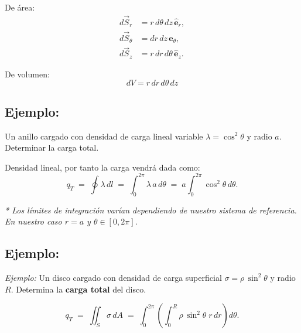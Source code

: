 \documentclass[a4paper,12pt]{article}
\begin{document}
De área:
\[
\begin{aligned}
d\vec{S}_r      &= r\,d\theta\,dz\,\hat{\mathbf e}_r,\\
d\vec{S}_\theta &= dr\,dz\,\hat{\mathbf e}_\theta,\\
d\vec{S}_z      &= r\,dr\,d\theta\,\hat{\mathbf e}_z.
\end{aligned}
\]

De volumen:
\[
dV = r\,dr\,d\theta\,dz
\]

\begin{center}
\end{center}

\subsection*{Ejemplo:}
Un anillo cargado con densidad de carga lineal variable $\lambda=\cos^{2}\theta$ y radio $a$.
Determinar la carga total.

Densidad lineal, por tanto la carga vendrá dada como:
\[
q_T \;=\; \oint \lambda\, dl
 \;=\; \int_{0}^{2\pi} \lambda\, a\, d\theta
 \;=\; a \int_{0}^{2\pi} \cos^{2}\theta\, d\theta .
\]

\textit{* Los límites de integración varían dependiendo de nuestro sistema de referencia.  
En nuestro caso $r=a$ y $\theta\in[0,2\pi]$.}

\bigskip

\subsection*{Ejemplo:}

\noindent
\textit{Ejemplo:} Un disco cargado con densidad de carga superficial $\sigma=\rho\,\sin^{2}\theta$ y radio $R$.  
Determina la \textbf{carga total} del disco.

\[
q_T \;=\; \iint_{S} \sigma\, dA
   \;=\; \int_{0}^{2\pi}\!\left(\int_{0}^{R} \rho\,\sin^{2}\theta \; r\,dr\right)\! d\theta .
\]
\end{document}
